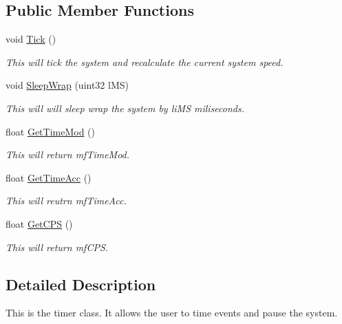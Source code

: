 \subsection*{Public Member Functions}
\begin{DoxyCompactItemize}
\item 
\hypertarget{classc_sync_ae0599d8020e8169a1a7a874a5b96499c}{
void \hyperlink{classc_sync_ae0599d8020e8169a1a7a874a5b96499c}{Tick} ()}
\label{classc_sync_ae0599d8020e8169a1a7a874a5b96499c}

\begin{DoxyCompactList}\small\item\em This will tick the system and recalculate the current system speed. \end{DoxyCompactList}\item 
\hypertarget{classc_sync_a59d51ce11e57b7829cbb00ec27b2869d}{
void \hyperlink{classc_sync_a59d51ce11e57b7829cbb00ec27b2869d}{SleepWrap} (uint32 lMS)}
\label{classc_sync_a59d51ce11e57b7829cbb00ec27b2869d}

\begin{DoxyCompactList}\small\item\em This will will sleep wrap the system by liMS miliseconds. \end{DoxyCompactList}\item 
\hypertarget{classc_sync_ac0a3f43667b9046a51860c2aa6140265}{
float \hyperlink{classc_sync_ac0a3f43667b9046a51860c2aa6140265}{GetTimeMod} ()}
\label{classc_sync_ac0a3f43667b9046a51860c2aa6140265}

\begin{DoxyCompactList}\small\item\em This will return mfTimeMod. \end{DoxyCompactList}\item 
\hypertarget{classc_sync_a44cc58ad37a1a59e4ccfcf1900ca0f61}{
float \hyperlink{classc_sync_a44cc58ad37a1a59e4ccfcf1900ca0f61}{GetTimeAcc} ()}
\label{classc_sync_a44cc58ad37a1a59e4ccfcf1900ca0f61}

\begin{DoxyCompactList}\small\item\em This will reutrn mfTimeAcc. \end{DoxyCompactList}\item 
\hypertarget{classc_sync_aab98fbafcb5f4a59d697b0225edaaa3c}{
float \hyperlink{classc_sync_aab98fbafcb5f4a59d697b0225edaaa3c}{GetCPS} ()}
\label{classc_sync_aab98fbafcb5f4a59d697b0225edaaa3c}

\begin{DoxyCompactList}\small\item\em This will return mfCPS. \end{DoxyCompactList}\end{DoxyCompactItemize}


\subsection{Detailed Description}
This is the timer class. It allows the user to time events and pause the system. 